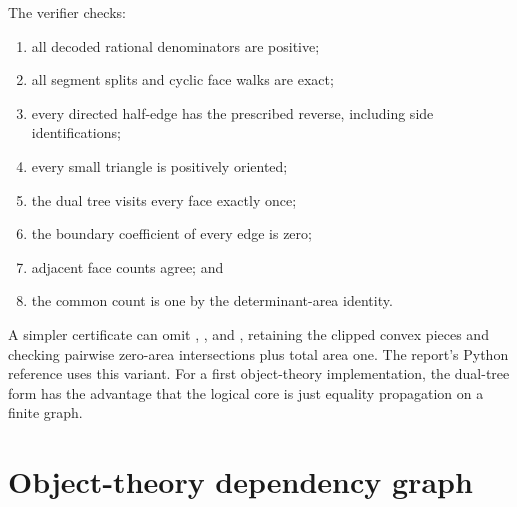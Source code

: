 The verifier checks:
\begin{enumerate}[label=(\arabic*)]
\item all decoded rational denominators are positive;
\item all segment splits and cyclic face walks are exact;
\item every directed half-edge has the prescribed reverse, including side identifications;
\item every small triangle is positively oriented;
\item the dual tree visits every face exactly once;
\item the boundary coefficient of every edge is zero;
\item adjacent face counts agree; and
\item the common count is one by the determinant-area identity.
\end{enumerate}

A simpler certificate can omit , , and , retaining the clipped convex pieces and checking pairwise zero-area intersections plus total area one.  The report's Python reference uses this variant.  For a first object-theory implementation, the dual-tree form has the advantage that the logical core is just equality propagation on a finite graph.

\section{Object-theory dependency graph}
\label{app:dependencies}

